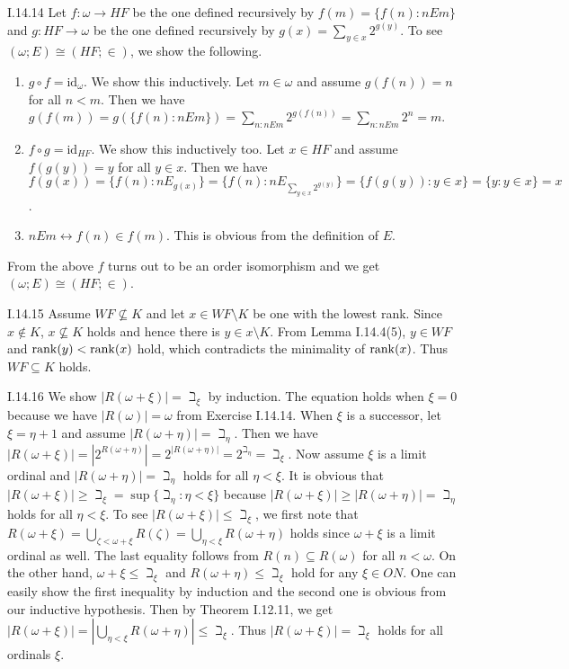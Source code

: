 \documentclass[12pt]{article}
\begin{document}
\begin{customthm}{I.14.14}
  Let $f:\omega\rightarrow HF$ be the one defined recursively by $f(m)=\{f(n):nEm\}$ and $g:HF\rightarrow\omega$ be the one defined recursively by $g(x)=\sum_{y\in x}2^{g(y)}$. To see $(\omega;E)\cong(HF;\in)$, we show the following.
  \begin{enumerate}
    \item\underline{$g\circ f = \mathrm{id}_\omega$}. We show this inductively. Let $m\in\omega$ and assume $g(f(n))=n$ for all $n<m$. Then we have $g(f(m))=g(\{f(n):nEm\})=\sum_{n:nEm}2^{g(f(n))}=\sum_{n:nEm}2^n=m$.
    \item\underline{$f\circ g = \mathrm{id}_{HF}$}. We show this inductively too. Let $x\in HF$ and assume $f(g(y))=y$ for all $y\in x$. Then we have $f(g(x))=\{f(n):nE_{g(x)}\}=\{f(n):nE_{\sum_{y\in x}2^{g(y)}}\}=\{f(g(y)):y\in x\}=\{y:y\in x\}=x$.
    \item\underline{$nEm\leftrightarrow f(n)\in f(m)$}. This is obvious from the definition of $E$.
  \end{enumerate}
  From the above $f$ turns out to be an order isomorphism and we get $(\omega;E)\cong(HF;\in)$.
\end{customthm}

\begin{customthm}{I.14.15}
  Assume $WF\not\subseteq K$ and let $x\in WF\setminus K$ be one with the lowest rank. Since $x\not\in K$, $x\not\subseteq K$ holds and hence there is $y\in x\setminus K$. From Lemma I.14.4(5), $y\in WF$ and $\mathop{\mathrm{rank}}(y)<\mathop{\mathrm{rank}}(x)$ hold, which contradicts the minimality of $\mathop{\mathrm{rank}}(x)$. Thus $WF\subseteq K$ holds.
\end{customthm}

\begin{customthm}{I.14.16}
  We show $|R(\omega+\xi)|=\beth_\xi$ by induction. The equation holds when $\xi=0$ because we have $|R(\omega)|=\omega$ from Exercise I.14.14. When $\xi$ is a successor, let $\xi=\eta+1$ and assume $|R(\omega+\eta)|=\beth_\eta$. Then we have $|R(\omega+\xi)|=|2^{R(\omega+\eta)}|=2^{|R(\omega+\eta)|}=2^{\beth_\eta}=\beth_\xi$. Now assume $\xi$ is a limit ordinal and $|R(\omega+\eta)|=\beth_\eta$ holds for all $\eta<\xi$. It is obvious that $|R(\omega+\xi)|\geq\beth_\xi=\sup\{\beth_\eta:\eta<\xi\}$ because $|R(\omega+\xi)|\geq|R(\omega+\eta)|=\beth_\eta$ holds for all $\eta<\xi$. To see $|R(\omega+\xi)|\leq\beth_\xi$, we first note that $R(\omega+\xi)=\bigcup_{\zeta<\omega+\xi}R(\zeta)=\bigcup_{\eta<\xi}R(\omega+\eta)$ holds since $\omega+\xi$ is a limit ordinal as well. The last equality follows from $R(n)\subseteq R(\omega)$ for all $n<\omega$. On the other hand, $\omega+\xi\leq\beth_\xi$ and $R(\omega+\eta)\leq\beth_\xi$ hold for any $\xi\in ON$. One can easily show the first inequality by induction and the second one is obvious from our inductive hypothesis. Then by Theorem I.12.11, we get $|R(\omega+\xi)|=|\bigcup_{\eta<\xi}R(\omega+\eta)|\leq\beth_\xi$. Thus $|R(\omega+\xi)|=\beth_\xi$ holds for all ordinals $\xi$.
\end{customthm}
\end{document}
